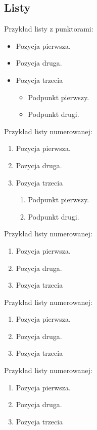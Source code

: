 \documentclass[twoside,a4paper,12pt]{report} %
\theoremstyle{break}
\begin{document}
\subsection{Listy}
Przykład listy z punktorami:
\begin{itemize}
    \item Pozycja pierwsza.
    \item Pozycja druga.
    \item Pozycja trzecia
    \begin{itemize}
        \item Podpunkt pierwszy.
        \item Podpunkt drugi.
    \end{itemize}
\end{itemize}\bigskip

Przykład listy numerowanej:
\begin{enumerate}
    \item Pozycja pierwsza.
    \item Pozycja druga.
    \item Pozycja trzecia
    \begin{enumerate}
        \item Podpunkt pierwszy.
        \item Podpunkt drugi.
    \end{enumerate}
\end{enumerate}\bigskip

Przykład listy numerowanej:
\begin{enumerate}[label=\roman*.]
    \item Pozycja pierwsza.
    \item Pozycja druga.
    \item Pozycja trzecia
\end{enumerate}\bigskip

Przykład listy numerowanej:
\begin{enumerate}[label=\Roman*.,start=4]
    \item Pozycja pierwsza.
    \item Pozycja druga.
    \item Pozycja trzecia
\end{enumerate}\bigskip

Przykład listy numerowanej:
\begin{enumerate}[label=\alph*.]
    \item Pozycja pierwsza.
    \item Pozycja druga.
    \item Pozycja trzecia
\end{enumerate}\bigskip
\end{document}

